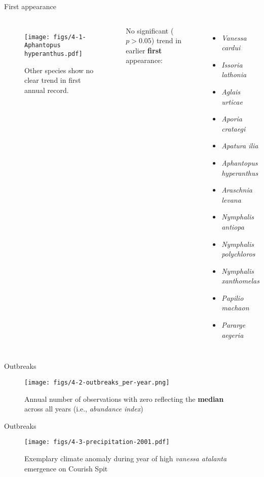 \documentclass[english, xcolor=dvipsnames, 11pt]{beamer}
\begin{document}
	\begin{frame}{First appearance}
		\begin{columns}
			\begin{figure}
				\centering
				\texttt{[image: figs/4-1-Aphantopus hyperanthus.pdf]}
				\caption{Other species show no clear trend in first annual record.}
				\label{fig:first-app-not-sig}
			\end{figure}
			No significant (\(p > 0.05\)) trend in earlier \textbf{first} appearance:
			\begin{itemize}
				\setlength\itemsep{-0.5em}
				\item \textit{Vanessa cardui}
				\item \textit{Issoria lathonia}
				\item \textit{Aglais urticae}
				\item \textit{Aporia crataegi}
				\item \textit{Apatura ilia}
				\item \textit{Aphantopus hyperanthus}
				\item \textit{Araschnia levana}
				\item \textit{Nymphalis antiopa}
				\item \textit{Nymphalis polychloros}
				\item \textit{Nymphalis xanthomelas}
				\item \textit{Papilio machaon}
				\item \textit{Pararge aegeria}
			\end{itemize}
		\end{columns}
	\end{frame}

	
	\begin{frame}{Outbreaks}
		\begin{figure}
			\centering
			\texttt{[image: figs/4-2-outbreaks\_per-year.png]}
			\caption{Annual number of observations with zero reflecting the \textbf{median} across all years (i.e., \textit{abundance index})}
			\label{fig:outbreaks}
		\end{figure}
	\end{frame}

	
	\begin{frame}{Outbreaks}
		\begin{figure}
			\centering
			\texttt{[image: figs/4-3-precipitation-2001.pdf]}
			\caption{Exemplary climate anomaly during year of high \textit{vanessa atalanta} emergence on Courish Spit}
			\label{fig:climate-anomalies}
		\end{figure}
	\end{frame}
\end{document}
